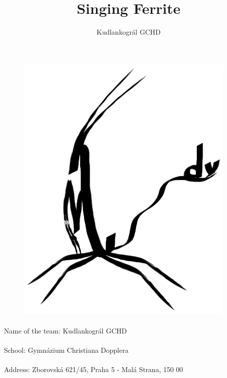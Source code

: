 \documentclass[10pt,a4paper]{article}
\title{Singing Ferrite}
\author{Kudlankográl GCHD}
\date{}
\makeatletter
\newcommand{\settitle}{\@maketitle}
\makeatother
\begin{document}
\settitle
\thispagestyle{empty}
\addtocounter{page}{-1}


\begin{figure}[H]
\centering
    \includegraphics[width=0.95\textwidth]{kudlankogral.png}
\end{figure}

\paragraph{}
Name of the team: Kudlankográl GCHD
\paragraph{}
School: Gymnázium Christiana Dopplera
\paragraph{}
Address: Zborovská 621/45, Praha 5 - Malá Strana, 150 00

\clearpage
\newpage


\author{}
\maketitle
\tableofcontents
\end{document}
